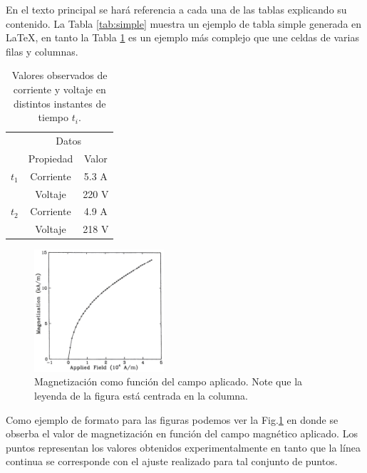 \documentclass[a4paper, 10pt, conference]{ieeeconf}      %
\begin{document}
En el texto principal se har\'a referencia a cada una de las tablas explicando su contenido. La Tabla \ref{tab:simple} muestra un ejemplo de tabla simple generada en LaTeX, en tanto la Tabla \ref{tab:compleja} es un ejemplo m\'as complejo que une celdas de varias filas y columnas. 

\begin{table}[!h]
\begin{center}
\begin{tabular}{|l|c|c|}
\cline{2-3}
\multicolumn{1}{c}{}& \multicolumn{2}{|c|}{Datos} \\
\cline{2-3}
\multicolumn{1}{c|}{}& Propiedad & Valor \\
\hline \cline{2-3} {$t_1$} & Corriente  & 5.3 A \\
\cline{2-3}
                      & Voltaje    & 220 V\\
\hline \cline{2-3} {$t_2$} & Corriente  & 4.9 A \\ \cline{2-3}
                     & Voltaje    & 218 V\\
\hline
 \end{tabular}
 \end{center}
 \caption{Valores observados de corriente y voltaje en distintos instantes de tiempo $t_i$.}
 \label{tab:compleja}
\end{table}


\begin{figure}[htp]
\centering
\includegraphics[width=0.43\textwidth]{./figuras/Fig.jpg}
\caption{Magnetizaci\'on como funci\'on del campo aplicado.
Note que la leyenda de la figura est\'a centrada en la columna. } 
\label{fig:fig}
\end{figure}

Como ejemplo de formato para las figuras podemos ver la Fig.\ref{fig:fig} en donde se obserba el valor de magnetizaci\'on en funci\'on del campo magn\'etico aplicado. Los puntos representan los valores obtenidos experimentalmente en tanto que la l\'inea continua se corresponde con el ajuste realizado para tal conjunto de puntos.  
\end{document}
